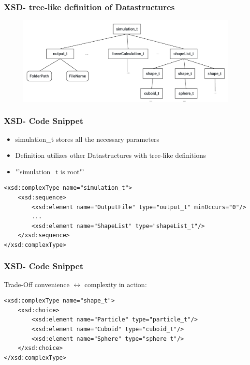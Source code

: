 
\begin{frame}
	\frametitle{XSD- tree-like definition of Datastructures}
	\begin{figure}
		\centering
		\includegraphics[width=\linewidth]{xsdScetch}
		\label{fig:xsdscetchtbc}
	\end{figure}
	
	
\end{frame}

\begin{frame}[fragile]
	\frametitle{XSD- Code Snippet}
	\large
	\begin{itemize}
		\item simulation\_t stores all the necessary parameters
		\item Definition utilizes other Datastructures with tree-like definitions
		\item "'simulation\_t is root"'
	\end{itemize}
	
	\vspace{0.3cm}
	
	\begin{lstlisting}
<xsd:complexType name="simulation_t">
	<xsd:sequence>
		<xsd:element name="OutputFile" type="output_t" minOccurs="0"/>
		...
		<xsd:element name="ShapeList" type="shapeList_t"/>
	</xsd:sequence>
</xsd:complexType>
	\end{lstlisting}
\end{frame}

\begin{frame}[fragile]
	\frametitle{XSD- Code Snippet}
	\Large
	Trade-Off convenience $\leftrightarrow$ complexity in action:
	\large
	\vspace{1cm}
	\begin{lstlisting}
<xsd:complexType name="shape_t">
	<xsd:choice>
		<xsd:element name="Particle" type="particle_t"/>
		<xsd:element name="Cuboid" type="cuboid_t"/>
		<xsd:element name="Sphere" type="sphere_t"/>
	</xsd:choice>
</xsd:complexType>
	\end{lstlisting}
	
\end{frame}


